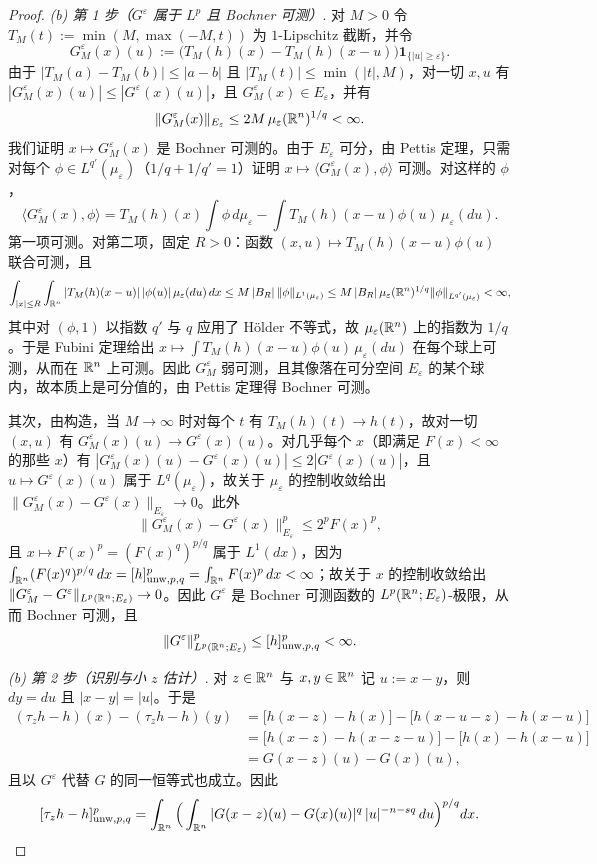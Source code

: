 \begin{proof}
\emph{(b) 第 1 步（$G^\varepsilon$ 属于 $L^p$ 且 Bochner 可测）}. 对 $M>0$ 令 $T_M(t):=\min(M,\max(-M,t))$ 为 $1$-Lipschitz 截断，并令
\[
  G^\varepsilon_M(x)(u):=\big(T_M(h)(x)-T_M(h)(x-u)\big)\mathbf{1}_{\{|u|\ge\varepsilon\}}.
\]
由于 $|T_M(a)-T_M(b)|\le|a-b|$ 且 $|T_M(t)|\le\min(|t|,M)$，对一切 $x,u$ 有 $|G^\varepsilon_M(x)(u)|\le|G^\varepsilon(x)(u)|$，且 $G^\varepsilon_M(x)\in E_\varepsilon$，并有
\[
  \|G^\varepsilon_M(x)\|_{E_\varepsilon}\le2M\,\mu_\varepsilon(\mathbb{R}^n)^{1/q}<\infty .
\]
我们证明 $x\mapsto G^\varepsilon_M(x)$ 是 Bochner 可测的。由于 $E_\varepsilon$ 可分，由 Pettis 定理，只需对每个 $\phi\in L^{q'}(\mu_\varepsilon)$（$1/q+1/q'=1$）证明 $x\mapsto\langle G^\varepsilon_M(x),\phi\rangle$ 可测。对这样的 $\phi$，
\[
  \langle G^\varepsilon_M(x),\phi\rangle=T_M(h)(x)\int\phi\,d\mu_\varepsilon-\int T_M(h)(x-u)\phi(u)\,\mu_\varepsilon(du).
\]
第一项可测。对第二项，固定 $R>0$：函数 $(x,u)\mapsto T_M(h)(x-u)\phi(u)$ 联合可测，且
\[
  \int_{|x|\le R}\int_{\mathbb{R}^n}|T_M(h)(x-u)|\,|\phi(u)|\,\mu_\varepsilon(du)\,dx
  \le M\,|B_R|\,\|\phi\|_{L^1(\mu_\varepsilon)}
  \le M\,|B_R|\,\mu_\varepsilon(\mathbb{R}^n)^{1/q}\|\phi\|_{L^{q'}(\mu_\varepsilon)}<\infty,
\]
其中对 $(\phi,1)$ 以指数 $q'$ 与 $q$ 应用了 H\"older 不等式，故 $\mu_\varepsilon(\mathbb{R}^n)$ 上的指数为 $1/q$。于是 Fubini 定理给出 $x\mapsto\int T_M(h)(x-u)\phi(u)\,\mu_\varepsilon(du)$ 在每个球上可测，从而在 $\mathbb{R}^n$ 上可测。因此 $G^\varepsilon_M$ 弱可测，且其像落在可分空间 $E_\varepsilon$ 的某个球内，故本质上是可分值的，由 Pettis 定理得 Bochner 可测。

其次，由构造，当 $M\to\infty$ 时对每个 $t$ 有 $T_M(h)(t)\to h(t)$，故对一切 $(x,u)$ 有 $G^\varepsilon_M(x)(u)\to G^\varepsilon(x)(u)$。对几乎每个 $x$（即满足 $F(x)<\infty$ 的那些 $x$）有 $|G^\varepsilon_M(x)(u)-G^\varepsilon(x)(u)|\le2|G^\varepsilon(x)(u)|$，且 $u\mapsto G^\varepsilon(x)(u)$ 属于 $L^q(\mu_\varepsilon)$，故关于 $\mu_\varepsilon$ 的控制收敛给出 $\|G^\varepsilon_M(x)-G^\varepsilon(x)\|_{E_\varepsilon}\to0$。此外
\[
  \|G^\varepsilon_M(x)-G^\varepsilon(x)\|_{E_\varepsilon}^p\le2^pF(x)^p,
\]
且 $x\mapsto F(x)^p=(F(x)^q)^{p/q}$ 属于 $L^1(dx)$，因为 $\int_{\mathbb{R}^n}(F(x)^q)^{p/q}\,dx=[h]_{\mathrm{unw},p,q}^p=\int_{\mathbb{R}^n}F(x)^p\,dx<\infty$；故关于 $x$ 的控制收敛给出 $\|G^\varepsilon_M-G^\varepsilon\|_{L^p(\mathbb{R}^n;E_\varepsilon)}\to0$。因此 $G^\varepsilon$ 是 Bochner 可测函数的 $L^p(\mathbb{R}^n;E_\varepsilon)$-极限，从而 Bochner 可测，且
\[
  \|G^\varepsilon\|_{L^p(\mathbb{R}^n;E_\varepsilon)}^p\le[h]_{\mathrm{unw},p,q}^p<\infty .
\]

\emph{(b) 第 2 步（识别与小 $z$ 估计）}. 对 $z\in\mathbb{R}^n$ 与 $x,y\in\mathbb{R}^n$ 记 $u:=x-y$，则 $dy=du$ 且 $|x-y|=|u|$。于是
\begin{align*}
  (\tau_zh-h)(x)-(\tau_zh-h)(y)
  &=\big[h(x-z)-h(x)\big]-\big[h(x-u-z)-h(x-u)\big]\\
  &=\big[h(x-z)-h(x-z-u)\big]-\big[h(x)-h(x-u)\big]\\
  &=G(x-z)(u)-G(x)(u),
\end{align*}
且以 $G^\varepsilon$ 代替 $G$ 的同一恒等式也成立。因此
\[
  [\tau_zh-h]_{\mathrm{unw},p,q}^p=\int_{\mathbb{R}^n}\Big(\int_{\mathbb{R}^n}|G(x-z)(u)-G(x)(u)|^q\,|u|^{-n-sq}\,du\Big)^{p/q}dx.
\]


\end{proof}
